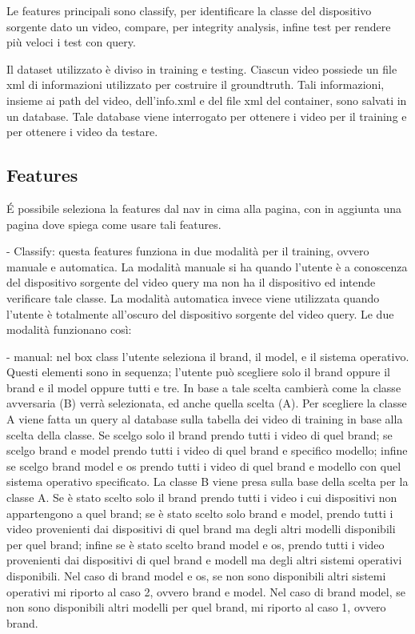 Le features principali sono classify, per identificare la classe del dispositivo sorgente dato un video, compare, per integrity analysis, infine test per rendere più veloci i test con query.

Il dataset utilizzato è diviso in training e testing. Ciascun video possiede un file xml di informazioni utilizzato per costruire il groundtruth. Tali informazioni, insieme ai path del video, dell'info.xml e del file xml del container, sono salvati in un database. Tale database viene interrogato per ottenere i video per il training e per ottenere i video da testare.

\subsection{Features}

É possibile seleziona la features dal nav in cima alla pagina, con in aggiunta una pagina dove spiega come usare tali features.

- Classify:
questa features funziona in due modalità per il training, ovvero manuale e automatica. La modalità manuale si ha quando l'utente è a conoscenza del dispositivo sorgente del video query ma non ha il dispositivo ed intende verificare tale classe. La modalità automatica invece viene utilizzata quando l'utente è totalmente all'oscuro del dispositivo sorgente del video query. Le due modalità funzionano così:

 - manual:
  nel box class l'utente seleziona il brand, il model, e il sistema operativo. Questi elementi sono in sequenza; l'utente può scegliere solo il brand oppure il brand e il model oppure tutti e tre. In base a tale scelta cambierà come la classe avversaria (B) verrà selezionata, ed anche quella scelta (A).
  Per scegliere la classe A viene fatta un query al database sulla tabella dei video di training in base alla scelta della classe. Se scelgo solo il brand prendo tutti i video di quel brand; se scelgo brand e model prendo tutti i video di quel brand e specifico modello; infine se scelgo brand model e os prendo tutti i video di quel brand e modello con quel sistema operativo specificato.
  La classe B viene presa sulla base della scelta per la classe A. Se è stato scelto solo il brand prendo tutti i video i cui dispositivi non appartengono a quel brand; se è stato scelto solo brand e model, prendo tutti i video provenienti dai dispositivi di quel brand ma degli altri modelli disponibili per quel brand; infine se è stato scelto brand model e os, prendo tutti i video provenienti dai dispositivi di quel brand e modell ma degli altri sistemi operativi disponibili.
  Nel caso di brand model e os, se non sono disponibili altri sistemi operativi mi riporto al caso 2, ovvero brand e model. Nel caso di brand model, se non sono disponibili altri modelli per quel brand, mi riporto al caso 1, ovvero brand.

